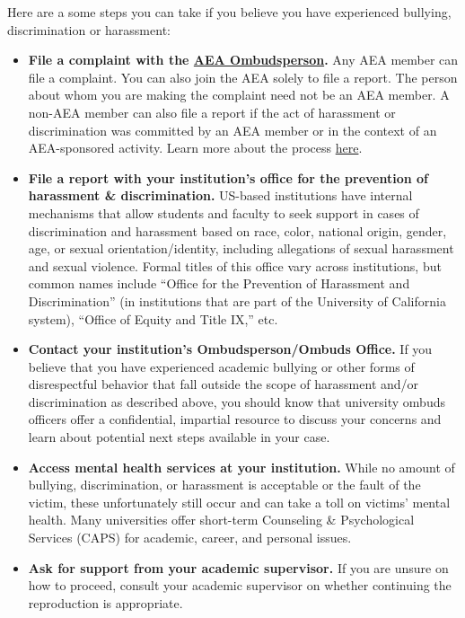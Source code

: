 Here are a some steps you can take if you believe you have experienced
bullying, discrimination or harassment:

\begin{itemize}
\tightlist
\item
  \textbf{File a complaint with the
  \href{https://www.aeaweb.org/about-aea/aea-ombudsperson}{AEA
  Ombudsperson}.} Any AEA member can file a complaint. You can also join
  the AEA solely to file a report. The person about whom you are making
  the complaint need not be an AEA member. A non-AEA member can also
  file a report if the act of harassment or discrimination was committed
  by an AEA member or in the context of an AEA-sponsored activity. Learn
  more about the process
  \href{https://www.aeaweb.org/about-aea/aea-ombudsperson/faq}{here}.
\item
  \textbf{File a report with your institution's office for the
  prevention of harassment \& discrimination.} US-based institutions
  have internal mechanisms that allow students and faculty to seek
  support in cases of discrimination and harassment based on race,
  color, national origin, gender, age, or sexual orientation/identity,
  including allegations of sexual harassment and sexual violence. Formal
  titles of this office vary across institutions, but common names
  include ``Office for the Prevention of Harassment and Discrimination''
  (in institutions that are part of the University of California
  system), ``Office of Equity and Title IX,'' etc.
\item
  \textbf{Contact your institution's Ombudsperson/Ombuds Office.} If you
  believe that you have experienced academic bullying or other forms of
  disrespectful behavior that fall outside the scope of harassment
  and/or discrimination as described above, you should know that
  university ombuds officers offer a confidential, impartial resource to
  discuss your concerns and learn about potential next steps available
  in your case.
\item
  \textbf{Access mental health services at your institution.} While no
  amount of bullying, discrimination, or harassment is acceptable or the
  fault of the victim, these unfortunately still occur and can take a
  toll on victims' mental health. Many universities offer short-term
  Counseling \& Psychological Services (CAPS) for academic, career, and
  personal issues.
\item
  \textbf{Ask for support from your academic supervisor.} If you are
  unsure on how to proceed, consult your academic supervisor on whether
  continuing the reproduction is appropriate.
\end{itemize}